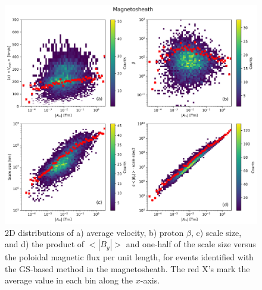 \begin{figure}[ht!]
    \centering
    \includegraphics[width=\textwidth]{Figures/GS analysis/heatmap_magnetosheath.png}
    \caption[2D distributions of various parameters vs. $|A_m|$ in the magnetosheath]{2D distributions of a) average velocity, b) proton $\beta$, c) scale size, and d) the product of $<|B_y|>$ and one-half of the scale size versus the poloidal magnetic flux per unit length, for events identified with the GS-based method in the magnetosheath. The red X's mark the average value in each bin along the $x$-axis.}
    \label{fig:heatmap-magntosheath}
\end{figure}

